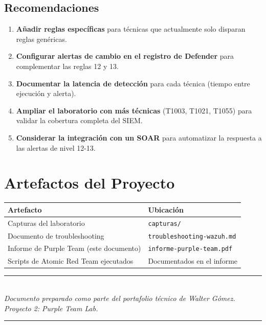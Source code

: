 \documentclass[11pt,a4paper]{article}
\begin{document}
	\subsection{Recomendaciones}
	
	\begin{enumerate}[leftmargin=1.5em]
		\item \textbf{Añadir reglas específicas} para técnicas que actualmente solo disparan reglas genéricas.
		\item \textbf{Configurar alertas de cambio en el registro de Defender} para complementar las reglas 12 y 13.
		\item \textbf{Documentar la latencia de detección} para cada técnica (tiempo entre ejecución y alerta).
		\item \textbf{Ampliar el laboratorio con más técnicas} (T1003, T1021, T1055) para validar la cobertura completa del SIEM.
		\item \textbf{Considerar la integración con un SOAR} para automatizar la respuesta a las alertas de nivel 12-13.
	\end{enumerate}
	
	\section{Artefactos del Proyecto}
	
	\begin{table}[H]
		\centering
		\begin{tabular}{@{}ll@{}}
			\toprule
			\textbf{Artefacto} & \textbf{Ubicación} \\ \midrule
			Capturas del laboratorio & \texttt{capturas/} \\
			Documento de troubleshooting & \texttt{troubleshooting-wazuh.md} \\
			Informe de Purple Team (este documento) & \texttt{informe-purple-team.pdf} \\
			Scripts de Atomic Red Team ejecutados & Documentados en el informe \\
			\bottomrule
		\end{tabular}
	\end{table}
	
	\vspace{1cm}
	
	\begin{center}
		\textcolor{purplegray}{\rule{0.5\textwidth}{0.4pt}}\\[0.3cm]
		\textit{Documento preparado como parte del portafolio técnico de Walter Gómez.\\
			Proyecto 2: Purple Team Lab.}\\[0.3cm]
		\textcolor{purplegray}{\rule{0.5\textwidth}{0.4pt}}
	\end{center}
	
\end{document}
